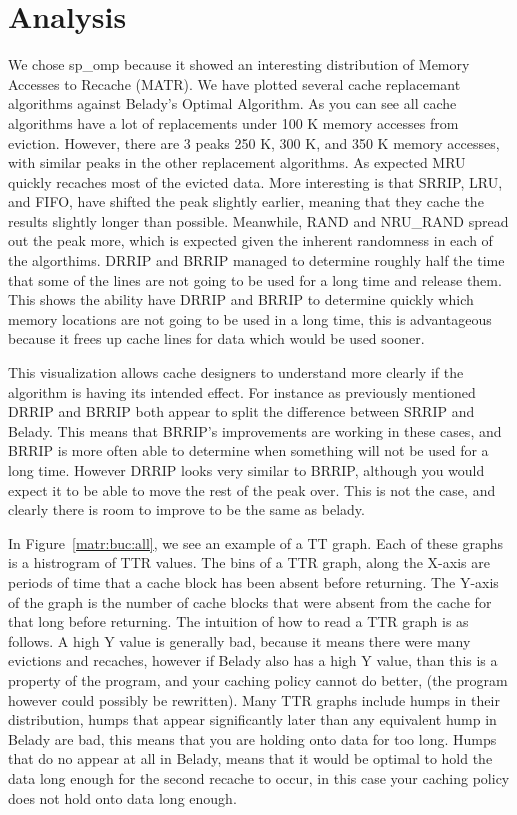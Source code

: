 \section{Analysis}

We chose sp\_omp because it showed an interesting distribution of Memory Accesses to Recache (MATR).
We have plotted several cache replacemant algorithms against Belady's Optimal Algorithm.
As you can see all cache algorithms have a lot of replacements under 100 K memory accesses from eviction.
However, there are 3 peaks 250 K, 300 K, and 350 K memory accesses, with similar peaks in the other replacement algorithms.
As expected MRU quickly recaches most of the evicted data.
More interesting is that SRRIP, LRU, and FIFO, have shifted the peak slightly earlier, meaning that they cache the results slightly longer than possible.
Meanwhile, RAND and NRU\_RAND spread out the peak more, which is expected given the inherent randomness in each of the algorthims.
DRRIP and BRRIP managed to determine roughly half the time that some of the lines are not going to be used for a long time and release them.
This shows the ability have DRRIP and BRRIP to determine quickly which memory locations are not going to be used in a long time,
 this is advantageous because it frees up cache lines for data which would be used sooner.

This visualization allows cache designers to understand more clearly if the algorithm is having its intended effect.
For instance as previously mentioned DRRIP and BRRIP both appear to split the difference between SRRIP and Belady.
This means that BRRIP's improvements are working in these cases, and BRRIP is more often able to determine when something will not be used for a long time.
However DRRIP looks very similar to BRRIP, although you would expect it to be able to move the rest of the peak over.
This is not the case, and clearly there is room to improve to be the same as belady.

In Figure~\ref{matr:buc:all}, we see an example of a TT graph.
Each of these graphs is a histrogram of TTR values.
The bins of a TTR graph, along the X-axis are periods of time that a cache block has been absent before returning.
The Y-axis of the graph is the number of cache blocks that were absent from the cache for that long before returning.
The intuition of how to read a TTR graph is as follows.
A high Y value is generally bad, because it means there were many evictions and recaches,
 however if Belady also has a high Y value, than this is a property of the program, and your caching policy cannot do better,
 (the program however could possibly be rewritten).
Many TTR graphs include humps in their distribution, humps that appear significantly later than any equivalent hump in Belady are bad,
 this means that you are holding onto data for too long.
Humps that do no appear at all in Belady, means that it would be optimal to hold the data long enough for the second recache to occur,
 in this case your caching policy does not hold onto data long enough.

